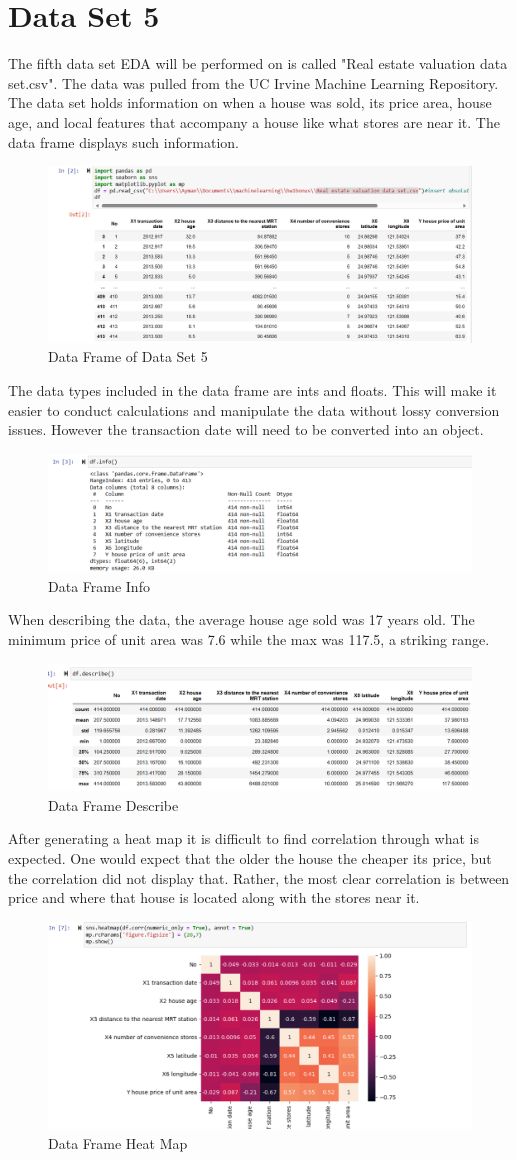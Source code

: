 \documentclass{article}
\begin{document}
\section{Data Set 5}
The fifth data set EDA will be performed on is called "Real estate valuation data set.csv". The data was pulled from the UC Irvine Machine Learning Repository. The data set holds information on when a house was sold, its price area, house age, and local features that accompany a house like what stores are near it. The data frame displays such information. 
\begin{figure}
    \centering
    \includegraphics[width=0.5\linewidth]{100.png}
    \caption{Data Frame of Data Set 5}
    \label{fig:enter-label}
\end{figure}
The data types included in the data frame are ints and floats. This will make it easier to conduct calculations and manipulate the data without lossy conversion issues. However the transaction date will need to be converted into an object.
\begin{figure}
    \centering
    \includegraphics[width=0.5\linewidth]{image.png}
    \caption{Data Frame Info}
    \label{fig:enter-label}
\end{figure}
When describing the data, the average house age sold was 17 years old. The minimum price of unit area was 7.6 while the max was 117.5, a striking range.
\begin{figure}
    \centering
    \includegraphics[width=0.5\linewidth]{300.png}
    \caption{Data Frame Describe}
    \label{fig:enter-label}
\end{figure}
After generating a heat map it is difficult to find correlation through what is expected. One would expect that the older the house the cheaper its price, but the correlation did not display that. Rather, the most clear correlation is between price and where that house is located along with the stores near it.
\begin{figure}
    \centering
    \includegraphics[width=0.5\linewidth]{400.png}
    \caption{Data Frame Heat Map}
    \label{fig:enter-label}
\end{figure}
\end{document}

